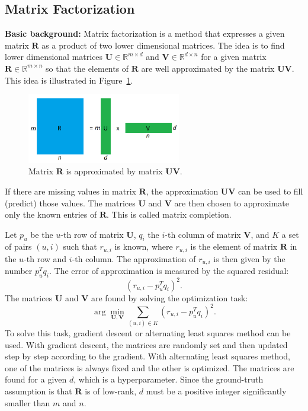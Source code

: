 \documentclass[thesis=M,english]{FITthesis}[2019/12/23]
\begin{document}
\subsection{Matrix Factorization}
\label{matrix_fac}
 \textbf{Basic background:} Matrix factorization is a method that expresses a given matrix $\boldsymbol{R}$ as a product of two lower dimensional matrices. The idea is to find lower dimensional matrices $\boldsymbol{U} \in \mathbb{R}^{m \times d}$ and $\boldsymbol{V} \in \mathbb{R}^{d \times n}$ for a given matrix $\boldsymbol{R} \in \mathbb{R}^{m \times n}$ so that the elements of $\boldsymbol{R}$ are well approximated by the matrix $\boldsymbol{U} \boldsymbol{V}$. This idea is illustrated in Figure~\ref{fig:mf}.
\begin{figure}[h]
    \centering
    \includegraphics[width=0.6\textwidth]{figures/mf_my.PNG}
    \caption{Matrix $\boldsymbol{R}$ is approximated by matrix $\boldsymbol{U} \boldsymbol{V}$.}
    \label{fig:mf}
\end{figure}
If there are missing values in matrix $\boldsymbol{R}$, the approximation $\boldsymbol{U} \boldsymbol{V}$ can be used to fill (predict) those values. The matrices $\boldsymbol{U}$ and $\boldsymbol{V}$ are then chosen to approximate only the known entries of $\boldsymbol{R}$. This is called matrix completion.

Let $p_u$ be the $u$-th row of matrix $\boldsymbol{U}$, $q_i$ the $i$-th column of matrix $\boldsymbol{V}$, and $K$ a set of pairs $(u, i)$ such that $r_{u, i}$ is known, where $r_{u, i}$ is the element of matrix $\boldsymbol{R}$ in the $u$-th row and $i$-th column. The approximation of $r_{u, i}$ is then given by the number $p_u^T q_i$. The error of approximation is measured by the squared residual: $$(r_{u, i} - p_u^T q_i)^2.$$ The matrices $\boldsymbol{U}$ and $\boldsymbol{V}$ are found by solving the optimization task: $$\arg \min_{\boldsymbol{U}, \boldsymbol{V}} \sum_{(u, i) \in K} (r_{u, i} - p_u^T q_i)^2.$$ To solve this task, gradient descent or alternating least squares method can be used. With gradient descent, the matrices are randomly set and then updated step by step according to the gradient. With alternating least squares method, one of the matrices is always fixed and the other is optimized. The matrices are found for a given $d$, which is a hyperparameter. Since the ground-truth assumption is that $\boldsymbol{R}$ is of low-rank, $d$ must be a positive integer significantly smaller than $m$ and $n$.
\end{document}
